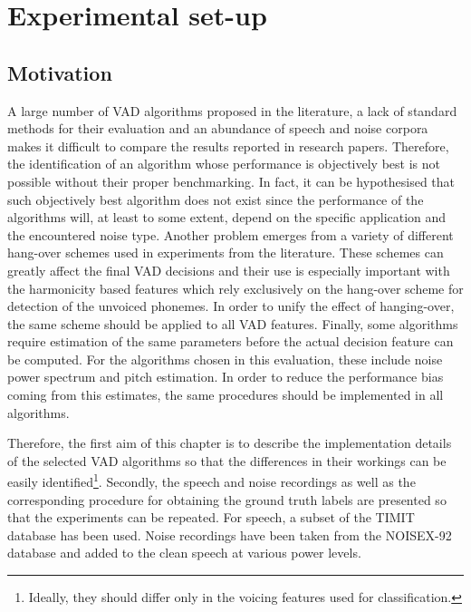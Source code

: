 
\chapter{Experimental set-up} %

\label{Chapter3} %



\section{Motivation}

A large number of VAD algorithms proposed in the literature, a lack of standard methods for their evaluation and an abundance of speech and noise corpora makes it difficult to compare the results reported in research papers. Therefore, the identification of an algorithm whose performance is objectively best is not possible without their proper benchmarking. In fact, it can be hypothesised that such objectively best algorithm does not exist since the performance of the algorithms will, at least to some extent, depend on the specific application and the encountered noise type. Another problem emerges from a variety of different hang-over schemes used in experiments from the literature. These schemes can greatly affect the final VAD decisions and their use is especially important with the harmonicity based features which rely exclusively on the hang-over scheme for detection of the unvoiced phonemes. In order to unify the effect of hanging-over, the same scheme should be applied to all VAD features. Finally, some algorithms require estimation of the same parameters before the actual decision feature can be computed. For the algorithms chosen in this evaluation, these include noise power spectrum and pitch estimation. In order to reduce the performance bias coming from this estimates, the same procedures should be implemented in all algorithms.

Therefore, the first aim of this chapter is to describe the implementation details of the selected VAD algorithms so that the differences in their workings can be easily identified\footnote{Ideally, they should differ only in the voicing features used for classification.}. Secondly, the speech and noise recordings as well as the corresponding procedure for obtaining the ground truth labels are presented so that the experiments can be repeated. For speech, a subset of the TIMIT \cite{TIMIT} database has been used. Noise recordings have been taken from the NOISEX-92 \cite{NOISEX} database and added to the clean speech at various power levels.


